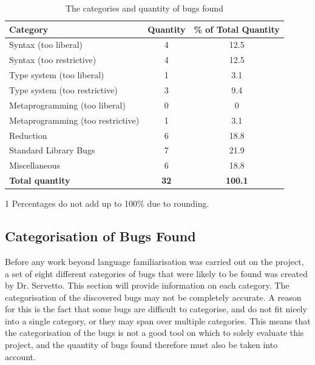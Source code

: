 \begin{table}[h]
\centering
\begin{threeparttable}
 \caption{The categories and quantity of bugs found}
    \begin{tabular}{| l | c | c |}
    \hline
    \textbf{Category} & \textbf{Quantity} & \textbf{\% of Total Quantity} \\ \hline
    Syntax (too liberal) & 4 & 12.5 \\ \hline
    Syntax (too restrictive) & 4 & 12.5 \\ \hline
    Type system (too liberal) & 1 & 3.1 \\ \hline
    Type system (too restrictive) & 3 & 9.4  \\ \hline
    Metaprogramming (too liberal) & 0 & 0  \\ \hline
    Metaprogramming (too restrictive) & 1  & 3.1 \\ \hline
    Reduction & 6  & 18.8 \\ \hline
    Standard Library Bugs & 7 & 21.9 \\ \hline
    Miscellaneous &  6  & 18.8\\ \hline
    \textbf{Total quantity}	& \textbf{32}  & \textbf{100.1}  \tnote{1} \\ \hline
    \end{tabular}

  \begin{tablenotes}
    \item[1] Percentages do not add up to 100\% due to rounding.
  \end{tablenotes}

\end{threeparttable}


\end{table}

\subsection{Categorisation of Bugs Found \label{cat}}

Before any work beyond language familiarisation was carried out on the project, a set of eight different categories of bugs that were likely to be found was created by Dr. Servetto. This section will provide information on each category. The categorisation of the discovered bugs may not be completely accurate. A reason for this is the fact that some bugs are difficult to categorise, and do not fit nicely into a single category, or they may span over multiple categories. This means that the categorisation of the bugs is not a good tool on which to solely evaluate this project, and the quantity of bugs found therefore must also be taken into account.

